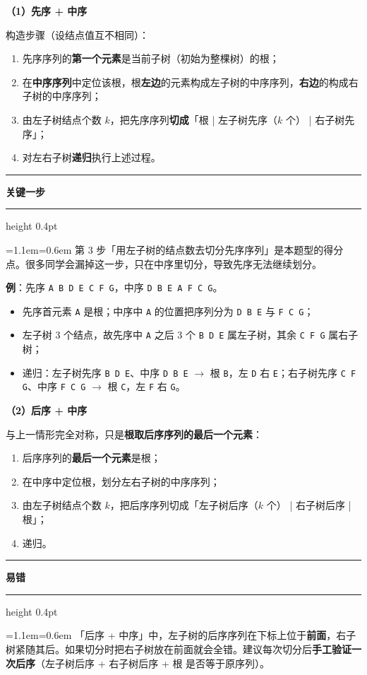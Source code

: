 \documentclass[11pt,openany,UTF8]{ctexbook}
\newcommand{\callouthead}[2]{%
  \par\addvspace{7pt}\noindent
  {\color{#1}\rule[-0.15em]{3pt}{1.05em}}\hspace{0.5em}%
  {\bfseries\color{#1}#2}\par\nobreak\vspace{-0.35em}%
  {\color{rulesep}\hrule height 0.4pt}\nobreak\vspace{0.45em}%
  \begingroup\small\setlength{\parindent}{0pt}%
  \leftskip=1.1em\rightskip=0.6em\noindent\ignorespaces}
\newcommand{\calloutend}{\par\endgroup\addvspace{7pt}}
\newenvironment{callwarn}[1]{\callouthead{warnbar}{#1}}{\calloutend}
\begin{document}
\textbf{（1）先序 + 中序}

构造步骤（设结点值互不相同）：

\begin{enumerate}
\item 先序序列的\textbf{第一个元素}是当前子树（初始为整棵树）的根；
\item 在\textbf{中序序列}中定位该根，根\textbf{左边}的元素构成左子树的中序序列，\textbf{右边}的构成右子树的中序序列；
\item 由左子树结点个数 $k$，把先序序列\textbf{切成}「根 | 左子树先序（$k$ 个） | 右子树先序」；
\item 对左右子树\textbf{递归}执行上述过程。
\end{enumerate}
\begin{callwarn}{关键一步}
第 3 步「用左子树的结点数去切分先序序列」是本题型的得分点。很多同学会漏掉这一步，只在中序里切分，导致先序无法继续划分。

\end{callwarn}

\textbf{例}：先序 \texttt{A B D E C F G}，中序 \texttt{D B E A F C G}。

\begin{itemize}
\item 先序首元素 \texttt{A} 是根；中序中 \texttt{A} 的位置把序列分为 \texttt{D B E} 与 \texttt{F C G}；
\item 左子树 3 个结点，故先序中 \texttt{A} 之后 3 个 \texttt{B D E} 属左子树，其余 \texttt{C F G} 属右子树；
\item 递归：左子树先序 \texttt{B D E}、中序 \texttt{D B E} $\to$ 根 \texttt{B}，左 \texttt{D} 右 \texttt{E}；右子树先序 \texttt{C F G}、中序 \texttt{F C G} $\to$ 根 \texttt{C}，左 \texttt{F} 右 \texttt{G}。
\end{itemize}
\textbf{（2）后序 + 中序}

与上一情形完全对称，只是\textbf{根取后序序列的最后一个元素}：

\begin{enumerate}
\item 后序序列的\textbf{最后一个元素}是根；
\item 在中序中定位根，划分左右子树的中序序列；
\item 由左子树结点个数 $k$，把后序序列切成「左子树后序（$k$ 个） | 右子树后序 | 根」；
\item 递归。
\end{enumerate}
\begin{callwarn}{易错}
「后序 + 中序」中，左子树的后序序列在下标上位于\textbf{前面}，右子树紧随其后。如果切分时把右子树放在前面就会全错。建议每次切分后\textbf{手工验证一次后序}（左子树后序 + 右子树后序 + 根 是否等于原序列）。

\end{callwarn}
\end{document}
